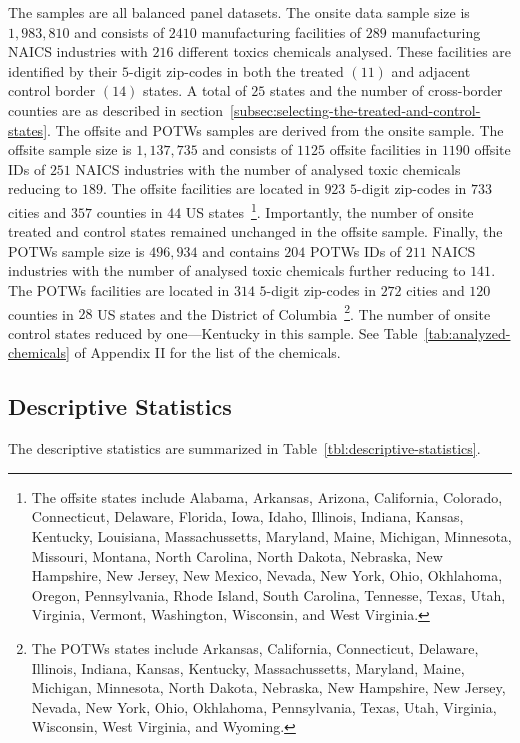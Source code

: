 \documentclass[12pt, english]{article}
\begin{document}
    The samples are all balanced panel datasets. The onsite data sample size is $1,983,810$ and consists of $2410$ manufacturing facilities of $289$ manufacturing NAICS industries with $216$ different toxics chemicals analysed. These facilities are identified by their $5$-digit zip-codes in both the treated $(11)$ and adjacent control border $(14)$ states. A total of $25$ states and the number of cross-border counties are as described in section~\ref{subsec:selecting-the-treated-and-control-states}. The offsite and POTWs samples are derived from the onsite sample. The offsite sample size is $1,137,735$ and consists of $1125$ offsite facilities in $1190$ offsite IDs of $251$ NAICS industries with the number of analysed toxic chemicals reducing to $189$. The offsite facilities are located in $923$ $5$-digit zip-codes in $733$ cities and $357$ counties in $44$ US states~\footnote{\tiny The offsite states include Alabama, Arkansas, Arizona, California, Colorado, Connecticut, Delaware, Florida, Iowa, Idaho, Illinois, Indiana, Kansas, Kentucky, Louisiana, Massachussetts, Maryland, Maine, Michigan, Minnesota, Missouri, Montana, North Carolina, North Dakota, Nebraska, New Hampshire, New Jersey, New Mexico, Nevada, New York, Ohio, Okhlahoma, Oregon, Pennsylvania, Rhode Island, South Carolina, Tennesse, Texas, Utah, Virginia, Vermont, Washington, Wisconsin, and West Virginia.}. Importantly, the number of onsite treated and control states remained unchanged in the offsite sample. Finally, the POTWs sample size is $496,934$ and contains $204$ POTWs IDs of $211$ NAICS industries with the number of analysed toxic chemicals further reducing to $141$. The POTWs facilities are located in $314$ $5$-digit zip-codes in $272$ cities and $120$ counties in $28$ US states and the District of Columbia~\footnote{\tiny The POTWs states include Arkansas, California, Connecticut, Delaware, Illinois, Indiana, Kansas, Kentucky, Massachussetts, Maryland, Maine, Michigan, Minnesota, North Dakota, Nebraska, New Hampshire, New Jersey, Nevada, New York, Ohio, Okhlahoma, Pennsylvania, Texas, Utah, Virginia, Wisconsin, West Virginia, and Wyoming.}. The number of onsite control states reduced by one---Kentucky in this sample. See Table~\ref{tab:analyzed-chemicals} of Appendix II for the list of the chemicals.

    \subsection{Descriptive Statistics}\label{subsec:descriptive-statistics}
    The descriptive statistics are summarized in Table~\ref{tbl:descriptive-statistics}.
\end{document}
